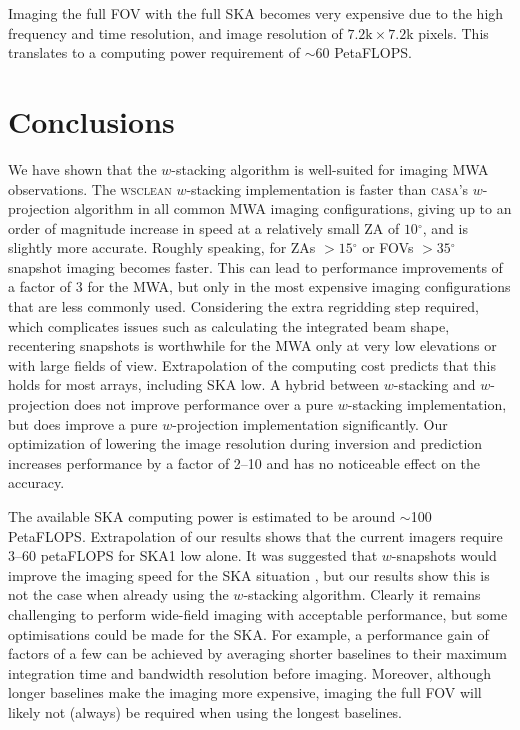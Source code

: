 \documentclass[useAMS,usenatbib]{mn2e}
\newcommand{\degree}{\ensuremath{^{\circ}}\xspace}
\begin{document}
Imaging the full FOV with the full SKA becomes very expensive due to the high frequency and time resolution, and image resolution of $7.2\textrm{k} \times 7.2$k pixels. This translates to a computing power requirement of $\sim60$ PetaFLOPS.

\section{Conclusions} \label{sec:conclusions}
We have shown that the $w$-stacking algorithm is well-suited for imaging MWA observations. The \textsc{wsclean} $w$-stacking implementation is faster than \textsc{casa}'s $w$-projection algorithm in all common MWA imaging configurations, giving up to an order of magnitude increase in speed at a relatively small ZA of $10$\degree, and is slightly more accurate. Roughly speaking, for ZAs $>15\degree$ or FOVs $>35\degree$ snapshot imaging becomes faster. This can lead to performance improvements of a factor of $3$ for the MWA, but only in the most expensive imaging configurations that are less commonly used. Considering the extra regridding step required, which complicates issues such as calculating the integrated beam shape, recentering snapshots is worthwhile for the MWA only at very low elevations or with large fields of view. Extrapolation of the computing cost predicts that this holds for most arrays, including SKA low. A hybrid between $w$-stacking and $w$-projection does not improve performance over a pure $w$-stacking implementation, but does improve a pure $w$-projection implementation significantly. Our optimization of lowering the image resolution during inversion and prediction increases performance by a factor of 2--10 and has no noticeable effect on the accuracy.

The available SKA computing power is estimated to be around $\sim$100 PetaFLOPS. Extrapolation of our results shows that the current imagers require $3$--$60$ petaFLOPS for SKA1 low alone. It was suggested that $w$-snapshots would improve the imaging speed for the SKA situation \citep{widefield-imaging-ska-cornwell}, but our results show this is not the case when already using the $w$-stacking algorithm. Clearly it remains challenging to perform wide-field imaging with acceptable performance, but some optimisations could be made for the SKA. For example, a performance gain of factors of a few can be achieved by averaging shorter baselines to their maximum integration time and bandwidth resolution before imaging. Moreover, although longer baselines make the imaging more expensive, imaging the full FOV will likely not (always) be required when using the longest baselines.
\end{document}
